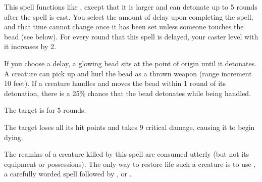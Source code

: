\begin{spelleffect}
    This spell functions like , except that it is larger and can detonate up to 5 rounds after the spell is cast. You select the amount of delay upon completing the spell, and that time cannot change once it has been set unless someone touches the bead (see below). For every round that this spell is delayed, your caster level with it increases by 2.

    If you choose a delay, a glowing bead sits at the point of origin until it detonates. A creature can pick up and hurl the bead as a thrown weapon (range increment 10 feet). If a creature handles and moves the bead within 1 round of its detonation, there is a 25\% chance that the bead detonates while being handled.
\end{spelleffect}
\begin{spellnotes}
    \destructivespellnotes

    \firespellnotes
\end{spellnotes}

\begin{spellhealthy}
    The target is \staggered for 5 rounds.
\end{spellhealthy}
\begin{spellblood}
    The target loses all its hit points and takes 9 critical damage, causing it to begin dying.
\end{spellblood}
\begin{spellnotes}
    The reamins of a creature killed by this spell are consumed utterly (but not its equipment or possessions). The only way to restore life such a creature is to use , a carefully worded  spell followed by , or .
\end{spellnotes}

